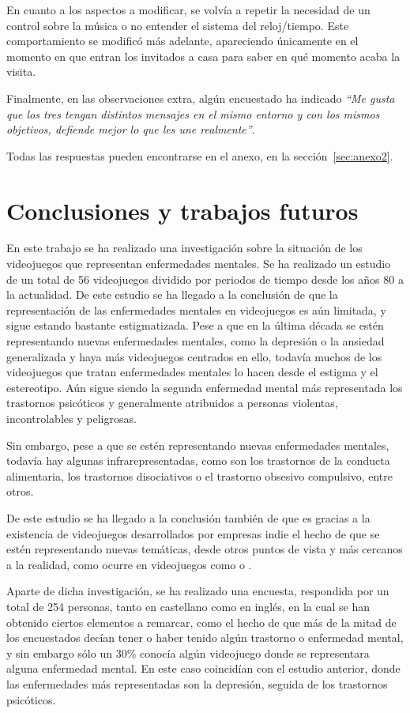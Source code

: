 \documentclass[12pt, a4paper,twoside,titlepage]{book}
\begin{document}
En cuanto a los aspectos a modificar, se volvía a repetir la necesidad de un control sobre la música o no entender el sistema del reloj/tiempo. Este comportamiento se modificó más adelante, apareciendo únicamente en el momento en que entran los invitados a casa para saber en qué momento acaba la visita. 

Finalmente, en las observaciones extra, algún encuestado ha indicado \textit{``Me gusta que los tres tengan distintos mensajes en el mismo entorno y con los mismos objetivos, defiende mejor lo que les une realmente''}. 

Todas las respuestas pueden encontrarse en el anexo, en la sección~\ref{sec:anexo2}. 

\chapter{Conclusiones y trabajos futuros}

En este trabajo se ha realizado una investigación sobre la situación de los videojuegos que representan enfermedades mentales. Se ha realizado un estudio de un total de 56 videojuegos dividido por periodos de tiempo desde los años 80 a la actualidad. De este estudio se ha llegado a la conclusión de que la representación de las enfermedades mentales en videojuegos es aún limitada, y sigue estando bastante estigmatizada. Pese a que en la última década se estén representando nuevas enfermedades mentales, como la depresión o la ansiedad generalizada y haya más videojuegos centrados en ello, todavía muchos de los videojuegos que tratan enfermedades mentales lo hacen desde el estigma y el estereotipo. Aún sigue siendo la segunda enfermedad mental más representada los trastornos psicóticos y generalmente atribuidos a personas violentas, incontrolables y peligrosas. 

Sin embargo, pese a que se estén representando nuevas enfermedades mentales, todavía hay algunas infrarepresentadas, como son los trastornos de la conducta alimentaria, los trastornos disociativos o el trastorno obsesivo compulsivo, entre otros. 

De este estudio se ha llegado a la conclusión también de que es gracias a la existencia de videojuegos desarrollados por empresas indie el hecho de que se estén representando nuevas temáticas, desde otros puntos de vista y más cercanos a la realidad, como ocurre en videojuegos como  o . 

Aparte de dicha investigación, se ha realizado una encuesta, respondida por un total de 254 personas, tanto en castellano como en inglés, en la cual se han obtenido ciertos elementos a remarcar, como el hecho de que más de la mitad de los encuestados decían tener o haber tenido algún trastorno o enfermedad mental, y sin embargo sólo un 30\% conocía algún videojuego donde se representara alguna enfermedad mental. En este caso coincidían con el estudio anterior, donde las enfermedades más representadas son la depresión, seguida de los trastornos psicóticos.
\end{document}
